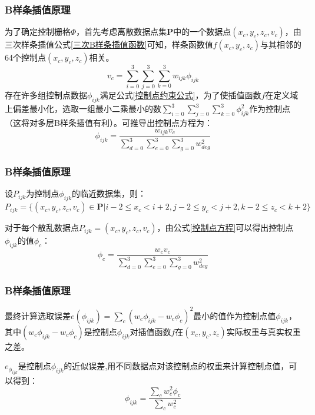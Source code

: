 \documentclass{beamer}
\begin{document}
\begin{frame}
    \frametitle{B样条插值原理}
    为了确定控制栅格$ \Phi $，首先考虑离散数据点集$ \mathbf{P} $中的一个数据点$ \left( x_{c}, y_{c}, z_{c}, v_{c} \right) $，由三次样条插值公式\ref{三次B样条插值函数}可知，样条函数值$ f\left( x_{c}, y_{c}, z_{c} \right) $与其相邻的64个控制点$ \left( x_{c}, y_{c}, z_{c} \right) $相关。
    \begin{equation}
        v_{c} = \sum_{i=0}^{3}\sum_{j=0}^{3}\sum_{k=0}^{3} w_{ijk} \phi_{ijk}
        \label{控制点约束公式}
    \end{equation}
    存在许多组控制点数据$ \phi_{ijk} $满足公式\ref{控制点约束公式}，为了使插值函数$ f $在定义域上偏差最小化，选取一组最小二乘最小的数$ \sum_{i=0}^{3}\sum_{j=0}^{3}\sum_{k=0}^{3} \phi_{ijk}^{2} $作为控制点（这将对多层B样条插值有利）。可推导出控制点方程为：
    \begin{equation}
        \phi_{ijk} = \frac{w_{ijk}v_{c}}{\sum_{d=0}^{3}\sum_{e=0}^{3}\sum_{g=0}^{3}w_{deg}^{2}}
        \label{控制点方程}
    \end{equation}
\end{frame}

\begin{frame}
    \frametitle{B样条插值原理}
    设$ P_{ijk} $为控制点$ \phi_{ijk} $的临近数据集，则：
    \begin{equation*}
        P_{ijk} = \{ \left( x_{c}, y_{c}, z_{c}, v_{c} \right) \in \mathbf{P} | i-2 \leq x_{c} < i+2, j-2 \leq y_{c} < j+2, k-2 \leq z_{c} < k+2 \}
    \end{equation*}

    对于每个散乱数据点$ P_{ijk} = \left( x_{c}, y_{c}, z_{c},v_{c} \right) $，由公式\ref{控制点方程}可以得出控制点$ \phi_{ijk} $的值$ \phi_{c} $：
    \begin{equation}
        \phi_{c} = \frac{w_{c}v_{c}}{\sum_{d=0}^{3}\sum_{e=0}^{3}\sum_{g=0}^{3}w_{deg}^{2}}
    \end{equation}
\end{frame}

\begin{frame}
    \frametitle{B样条插值原理}
    最终计算选取误差$ e\left( \phi_{ijk} \right) = \sum_{c}\left( w_{c}\phi_{ijk} - w_{c}\phi_{c} \right)^{2} $最小的值作为控制点值$ \phi_{ijk} $，其中$ \left( w_{c}\phi_{ijk} - w_{c}\phi_{c} \right) $是控制点$ \phi_{ijk} $对插值函数$ f $在$ \left( x_{c}, y_{c}, z_{c} \right) $实际权重与真实权重之差。

    $ e_{\phi_{ijk}} $是控制点$ \phi_{ijk} $的近似误差,用不同数据点对该控制点的权重来计算控制点值，可以得到：
    \begin{equation}
        \phi_{ijk} = \frac{\sum_{c}w_{c}^{2}\phi_{c}}{\sum_{c}w_{c}^{2}}
        \label{临近控制点计算方程}
    \end{equation}
\end{frame}
\end{document}
